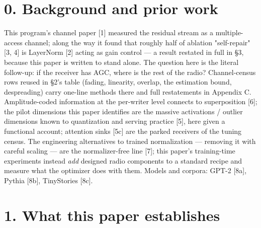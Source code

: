 \documentclass[10pt]{article}
\begin{document}
\section{0. Background and prior work}

This program's channel paper [1] measured the residual stream as a multiple-access channel; along
the way it found that roughly half of ablation "self-repair" [3, 4] is LayerNorm [2] acting as
gain control --- a result restated in full in §3, because this paper is written to stand alone.
The question here is the literal follow-up: if the receiver has AGC, where is the rest of the
radio? Channel-census rows reused in §2's table (fading, linearity, overlap, the estimation bound,
despreading) carry one-line methods there and full restatements in Appendix C. Amplitude-coded information at the per-writer level connects to superposition
[6]; the pilot dimensions this paper identifies are the massive activations / outlier dimensions
known to quantization and serving practice [5], here given a functional account; attention sinks
[5c] are the parked receivers of the tuning census. The engineering alternatives to trained
normalization --- removing it with careful scaling --- are the normalizer-free line [7]; this paper's
training-time experiments instead \emph{add} designed radio components to a standard recipe and measure
what the optimizer does with them. Models and corpora: GPT-2 [8a], Pythia [8b], TinyStories [8c].

\section{1. What this paper establishes}
\end{document}
